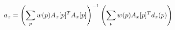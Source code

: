 \begin{equation}
    \footnotesize
    \label{eq:optimal-parameter-affine-weighted-halved}
    a_x = \left (\sum_p w(p) A_x[p]^T A_x[p] \right )^{-1} \left (\sum_p w(p) A_x[p]^T d_x(p) \right)
\end{equation}